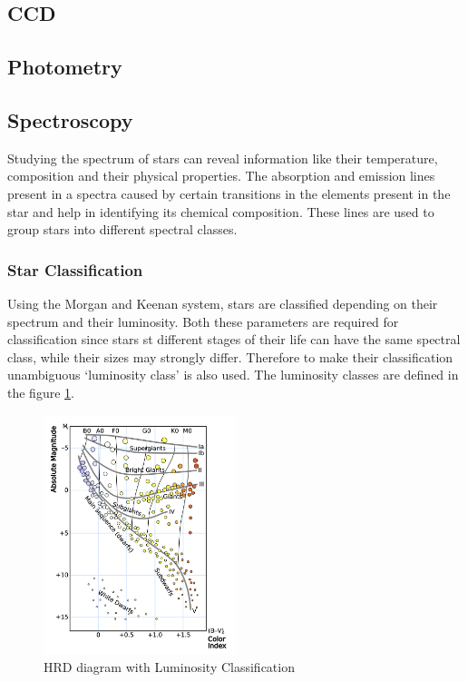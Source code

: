 \documentclass[12pt,a4paper]{article}
\begin{document}
  \subsection{CCD}
  \subsection{Photometry}
  \subsection{Spectroscopy}
    Studying the spectrum of stars can reveal information like their temperature, composition and their physical properties. The absorption and emission lines present 
    in a spectra caused by certain transitions in the elements present in the star and help in identifying its chemical composition. These lines are used to group
    stars into different spectral classes. \\

    \subsubsection{Star Classification}
    Using the Morgan and Keenan system, stars are classified depending on their spectrum and their luminosity. Both these parameters are required for classification since 
    stars st different stages of their life can have the same spectral class, while their sizes may strongly differ. Therefore to make their classification unambiguous `luminosity class' 
    is also used. The luminosity classes are defined in the figure \ref{fig:MK}.
    \begin{figure}[H]
      \centering
      \includegraphics[width=0.5\textwidth]{Pictures/HRD_lum_class.png}
      \caption{HRD diagram with Luminosity Classification}
      \label{fig:MK}
    \end{figure}
\end{document}
